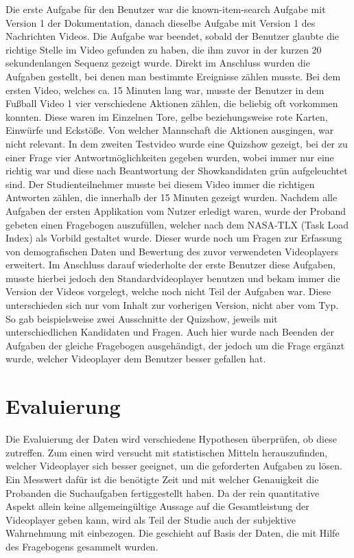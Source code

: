 \documentclass[11pt,a4paper]{report}
\begin{document}
Die erste Aufgabe für den Benutzer war die known-item-search Aufgabe mit Version 1 der Dokumentation, danach dieselbe Aufgabe mit Version 1 des Nachrichten Videos. Die Aufgabe war beendet, sobald der Benutzer glaubte die richtige Stelle im Video gefunden zu haben, die ihm zuvor in der kurzen 20 sekundenlangen Sequenz gezeigt wurde. Direkt im Anschluss wurden die Aufgaben gestellt, bei denen man bestimmte Ereignisse zählen musste. Bei dem ersten Video, welches ca. 15 Minuten lang war, musste der Benutzer in dem Fußball Video 1 vier verschiedene Aktionen zählen, die beliebig oft vorkommen konnten. Diese waren im Einzelnen Tore, gelbe beziehungsweise rote Karten, Einwürfe und Eckstöße. Von welcher Mannschaft die Aktionen ausgingen, war nicht relevant. In dem zweiten Testvideo wurde eine Quizshow gezeigt, bei der zu einer Frage vier Antwortmöglichkeiten gegeben wurden, wobei immer nur eine richtig war und diese nach Beantwortung der Showkandidaten grün aufgeleuchtet sind. Der Studienteilnehmer musste bei diesem Video immer die richtigen Antworten zählen, die innerhalb der 15 Minuten gezeigt wurden. Nachdem alle Aufgaben der ersten Applikation vom Nutzer erledigt waren, wurde der Proband gebeten einen Fragebogen auszufüllen, welcher nach dem NASA-TLX (Task Load Index) \cite{hart1988development} als Vorbild gestaltet wurde. Dieser wurde noch um Fragen zur Erfassung von demografischen Daten und Bewertung des zuvor verwendeten Videoplayers erweitert. Im Anschluss darauf wiederholte der erste Benutzer diese Aufgaben, musste hierbei jedoch den Standardvideoplayer benutzen und bekam immer die Version der Videos vorgelegt, welche noch nicht Teil der Aufgaben war. Diese unterschieden sich nur vom Inhalt zur vorherigen Version, nicht aber vom Typ. So gab beispielsweise zwei Ausschnitte der Quizshow, jeweils mit unterschiedlichen Kandidaten und Fragen. Auch hier wurde nach Beenden der Aufgaben der gleiche Fragebogen ausgehändigt, der jedoch um die Frage ergänzt wurde, welcher Videoplayer dem Benutzer besser gefallen hat.

\section{Evaluierung}
Die Evaluierung der Daten wird verschiedene Hypothesen überprüfen, ob diese zutreffen. Zum einen wird versucht mit statistischen Mitteln herauszufinden, welcher Videoplayer sich besser geeignet, um die geforderten Aufgaben zu lösen. Ein Messwert dafür ist die benötigte Zeit und mit welcher Genauigkeit die Probanden die Suchaufgaben fertiggestellt haben. Da der rein quantitative Aspekt allein keine allgemeingültige Aussage auf die Gesamtleistung der Videoplayer geben kann, wird als Teil der Studie auch der subjektive Wahrnehmung mit einbezogen. Die geschieht auf Basis der Daten, die mit Hilfe des Fragebogens gesammelt wurden.
\end{document}
